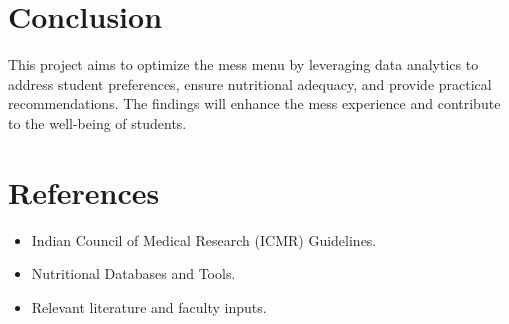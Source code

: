 \documentclass[12pt,a4paper]{article}
\begin{document}
\section{Conclusion}
This project aims to optimize the mess menu by leveraging data analytics to address student preferences, ensure nutritional adequacy, and provide practical recommendations. The findings will enhance the mess experience and contribute to the well-being of students.

\section{References}
\begin{itemize}
    \item Indian Council of Medical Research (ICMR) Guidelines.
    \item Nutritional Databases and Tools.
    \item Relevant literature and faculty inputs.
\end{itemize}
\end{document}
